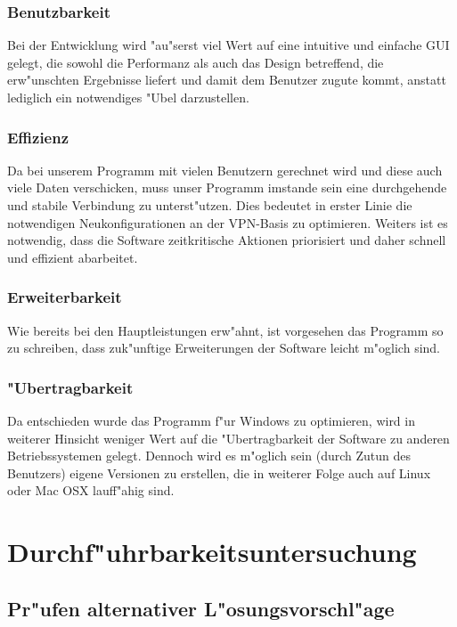 \documentclass[a4paper,12pt]{scrreprt}
\begin{document}
	\subsection{Benutzbarkeit}
	Bei der Entwicklung wird "au"serst viel Wert auf eine intuitive und einfache GUI gelegt, die sowohl die Performanz als auch das Design betreffend, die erw"unschten Ergebnisse liefert und damit dem Benutzer zugute kommt, anstatt lediglich ein notwendiges "Ubel darzustellen. 
			
	\subsection{Effizienz}
	Da bei unserem Programm  mit vielen Benutzern gerechnet wird und diese auch viele Daten verschicken, muss unser Programm imstande sein eine durchgehende und stabile Verbindung zu unterst"utzen. Dies bedeutet in erster Linie die notwendigen Neukonfigurationen an der VPN-Basis zu optimieren. Weiters ist es notwendig, dass die Software zeitkritische Aktionen priorisiert und daher schnell und effizient abarbeitet.
		
		
	\subsection{Erweiterbarkeit}
	Wie bereits bei den Hauptleistungen erw"ahnt, ist vorgesehen das Programm so zu schreiben, dass zuk"unftige Erweiterungen der Software leicht m"oglich sind. 
		
	\subsection{"Ubertragbarkeit}
	Da entschieden wurde das Programm f"ur Windows zu optimieren, wird in weiterer Hinsicht weniger Wert auf die "Ubertragbarkeit der Software zu anderen Betriebssystemen gelegt. Dennoch wird es m"oglich sein (durch Zutun des Benutzers) eigene Versionen zu erstellen, die in weiterer Folge auch auf Linux oder Mac OSX lauff"ahig sind.
			
			
\chapter{Durchf"uhrbarkeitsuntersuchung}
	
	\section{Pr"ufen alternativer L"osungsvorschl"age}
	
\end{document}
